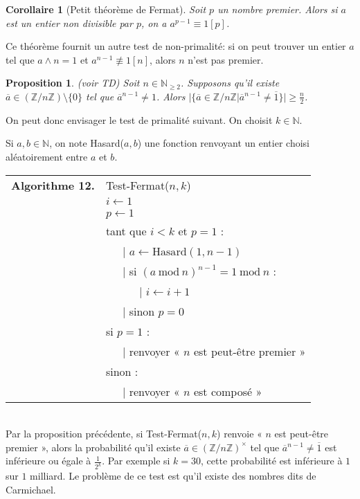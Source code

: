 \documentclass[12pt]{report}
\newtheorem{proposition}[thm]{Proposition}
\newtheorem{corollaire}[thm]{Corollaire}
\newcommand{\N}{\mathbb{N}}
\newcommand{\Z}{\mathbb{Z}}
\begin{document}
\begin{corollaire}[Petit théorème de Fermat] Soit $p$ un nombre premier. Alors si $a$ est un entier non divisible par $p$, on a $a^{p-1}\equiv 1 [p]$.
\end{corollaire}

Ce théorème fournit un autre test de non-primalité: si on peut trouver un entier $a$ tel que $a\wedge n=1$ et $a^{n-1}\not \equiv 1 [n]$, alors $n$ n'est pas premier. 

\begin{proposition}(voir TD)
Soit $n\in \N_{\geq 2}$. Supposons qu'il existe $\overline{a}\in (\Z/n\Z)\setminus\{0\}$ tel que $\overline{a}^{n-1}\neq 1$. Alors $|\{\overline{a}\in \Z/n\Z|\overline{a}^{n-1}\neq  \overline{1}\}|\geq \frac{n}{2}$. 
\end{proposition}

On peut donc envisager le test de primalité suivant. On choisit $k\in \N$.

Si $a,b\in \N$, on note Hasard($a,b$) une fonction renvoyant un entier choisi aléatoirement entre $a$ et $b$.

\begin{tabular}{ll}
\textbf{Algorithme 12.} & Test-Fermat($n,k$)\\
           & $i\leftarrow 1$ \\
           & $p\leftarrow 1$\\
           & tant que $i<k$ et $p=1$ :\\
           &\ \ \ {\rm |} $a\leftarrow \mathrm{Hasard}(1,n-1)$ \\
           & \ \ \ {\rm |} si $(a\ \mathrm{mod}\ n)^{n-1}=1\mathrm{\ mod\ }n$ : \\
           &\ \ \  \ \ \ {\rm |} $i\leftarrow i+1$\\
           & \ \ \ {\rm |} sinon $p=0$\\      
           & si $p=1$ :\\
           & \ \ \ {\rm |} renvoyer « $n$ est peut-être premier »\\
           & sinon :\\
           & \ \ \ {\rm |} renvoyer « $n$ est composé »\\
\end{tabular}\\



Par la proposition précédente, si Test-Fermat($n,k$) renvoie    « $n$ est peut-être premier », alors la probabilité qu'il existe $\overline{a}\in (\Z/n\Z)^\times$ tel que $\overline{a}^{n-1}\neq \overline{1}$ est inférieure ou égale à $\frac{1}{2^k}$. Par exemple si $k=30$, cette probabilité est inférieure à $1$ sur $1$ milliard. Le problème de ce test est qu'il existe des nombres dits de Carmichael.
\end{document}
